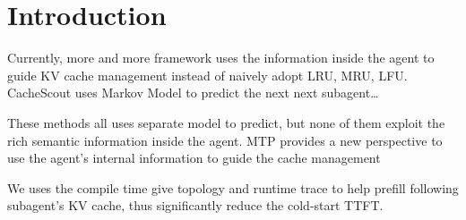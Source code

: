 \section{Introduction}
Currently, more and more framework uses the information inside the agent to guide KV cache management instead of naively adopt LRU, MRU, LFU. CacheScout uses Markov Model to predict the next next subagent\dots

These methods all uses separate model to predict, but none of them exploit the rich semantic information inside the agent. MTP provides a new perspective to use the agent's internal information to guide the cache management

We uses the compile time give topology and runtime trace to help prefill following subagent's KV cache, thus significantly reduce the cold-start TTFT. 